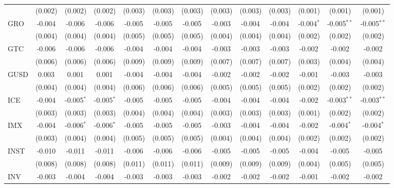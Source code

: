 \begin{table}[!htbp]
\begin{tabular}{@{\extracolsep{5pt}}lcccccccccccc}
  & (0.002) & (0.002) & (0.002) & (0.003) & (0.003) & (0.003) & (0.003) & (0.003) & (0.003) & (0.001) & (0.001) & (0.001) \\
 GRO & -0.004$^{}$ & -0.006$^{}$ & -0.006$^{}$ & -0.005$^{}$ & -0.005$^{}$ & -0.005$^{}$ & -0.003$^{}$ & -0.004$^{}$ & -0.004$^{}$ & -0.004$^{*}$ & -0.005$^{**}$ & -0.005$^{**}$ \\
  & (0.004) & (0.004) & (0.004) & (0.005) & (0.005) & (0.005) & (0.004) & (0.004) & (0.004) & (0.002) & (0.002) & (0.002) \\
 GTC & -0.006$^{}$ & -0.006$^{}$ & -0.006$^{}$ & -0.004$^{}$ & -0.004$^{}$ & -0.004$^{}$ & -0.003$^{}$ & -0.003$^{}$ & -0.003$^{}$ & -0.002$^{}$ & -0.002$^{}$ & -0.002$^{}$ \\
  & (0.006) & (0.006) & (0.006) & (0.009) & (0.009) & (0.009) & (0.007) & (0.007) & (0.007) & (0.003) & (0.004) & (0.004) \\
 GUSD & 0.003$^{}$ & 0.001$^{}$ & 0.001$^{}$ & -0.004$^{}$ & -0.004$^{}$ & -0.004$^{}$ & -0.002$^{}$ & -0.002$^{}$ & -0.002$^{}$ & -0.001$^{}$ & -0.003$^{}$ & -0.003$^{}$ \\
  & (0.004) & (0.004) & (0.004) & (0.006) & (0.006) & (0.006) & (0.005) & (0.005) & (0.005) & (0.002) & (0.002) & (0.002) \\
 ICE & -0.004$^{}$ & -0.005$^{*}$ & -0.005$^{*}$ & -0.005$^{}$ & -0.005$^{}$ & -0.005$^{}$ & -0.004$^{}$ & -0.004$^{}$ & -0.004$^{}$ & -0.002$^{}$ & -0.003$^{**}$ & -0.003$^{**}$ \\
  & (0.003) & (0.003) & (0.003) & (0.004) & (0.004) & (0.004) & (0.003) & (0.003) & (0.003) & (0.001) & (0.002) & (0.002) \\
 IMX & -0.004$^{}$ & -0.006$^{*}$ & -0.006$^{*}$ & -0.005$^{}$ & -0.005$^{}$ & -0.005$^{}$ & -0.003$^{}$ & -0.004$^{}$ & -0.004$^{}$ & -0.002$^{}$ & -0.004$^{*}$ & -0.004$^{*}$ \\
  & (0.003) & (0.004) & (0.004) & (0.005) & (0.005) & (0.005) & (0.004) & (0.004) & (0.004) & (0.002) & (0.002) & (0.002) \\
 INST & -0.010$^{}$ & -0.011$^{}$ & -0.011$^{}$ & -0.006$^{}$ & -0.006$^{}$ & -0.006$^{}$ & -0.005$^{}$ & -0.005$^{}$ & -0.005$^{}$ & -0.004$^{}$ & -0.005$^{}$ & -0.005$^{}$ \\
  & (0.008) & (0.008) & (0.008) & (0.011) & (0.011) & (0.011) & (0.009) & (0.009) & (0.009) & (0.004) & (0.005) & (0.005) \\
 INV & -0.003$^{}$ & -0.004$^{}$ & -0.004$^{}$ & -0.003$^{}$ & -0.003$^{}$ & -0.003$^{}$ & -0.002$^{}$ & -0.002$^{}$ & -0.002$^{}$ & -0.001$^{}$ & -0.002$^{}$ & -0.002$^{}$ \\

\end{tabular}
\end{table}
